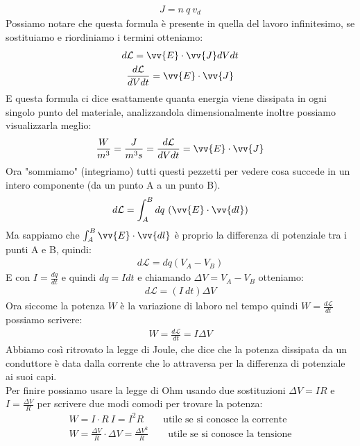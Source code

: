 \documentclass[a4paper, oneside]{article}
\begin{document}
\begin{gather*}
    J = n \ q \ v_d
\end{gather*}
Possiamo notare che questa formula è presente in quella del lavoro infinitesimo, se sostituiamo e riordiniamo i termini otteniamo:
\begin{gather*}
    d\mathcal{L} = \vv{E} \cdot \vv{J} dV dt\\
    \frac{d\mathcal{L}}{dV dt} = \vv{E} \cdot \vv{J}
\end{gather*}
E questa formula ci dice esattamente quanta energia viene dissipata in ogni singolo punto del materiale, analizzandola dimensionalmente inoltre possiamo visualizzarla meglio:
\begin{gather*}
    \frac{W}{m^3} = \frac{J}{m^3 s} = \frac{d \mathcal{L}}{dV dt} = \vv{E} \cdot \vv{J}\\
\end{gather*}
Ora "sommiamo" (integriamo) tutti questi pezzetti per vedere cosa succede in un intero componente (da un punto A a un punto B).
\begin{gather*}
    d\mathcal{L} = \int_A^B dq \ (\vv{E} \cdot \vv{dl}) 
\end{gather*}
Ma sappiamo che $\int_A^B \vv{E} \cdot \vv{dl}$ è proprio la differenza di potenziale tra i punti A e B, quindi:
\begin{gather*}
    d\mathcal{L} = dq (V_A - V_B) 
\end{gather*}
E con $I = \frac{dq}{dt}$ e quindi $dq = I dt$ e chiamando $\Delta V = V_A - V_B$ otteniamo:
\begin{gather*}
    d\mathcal{L} = (I \ dt) \Delta V
\end{gather*}
Ora siccome la potenza $W$ è la variazione di laboro nel tempo quindi $W = \frac{d\mathcal{L}}{dt}$ possiamo scrivere:
\begin{gather*}
    W = \frac{d\mathcal{L}}{dt} = I \Delta V
\end{gather*}
Abbiamo così ritrovato la legge di Joule, che dice che la potenza dissipata da un conduttore è data dalla corrente che lo attraversa per la differenza di potenziale ai suoi capi.\\
Per finire possiamo usare la legge di Ohm usando due sostituzioni $\Delta V = I R$ e $I = \frac{\Delta V}{R}$ per scrivere due modi comodi per trovare la potenza:
\begin{gather*}
    W = I \cdot R \ I = I^2 R \qquad \text{utile se si conosce la corrente}\\
    W = \frac{\Delta V}{R} \cdot \Delta V = \frac{\Delta V^2}{R} \qquad \text{utile se si conosce la tensione}
\end{gather*}
\end{document}
